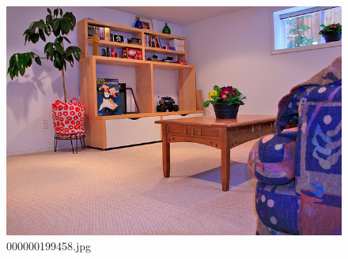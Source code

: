 \begin{figure}[h]
    \centering
    \includegraphics[width=0.8\linewidth]{../image set/hard/000000199458.jpg}
    \caption{000000199458.jpg}
\end{figure}
